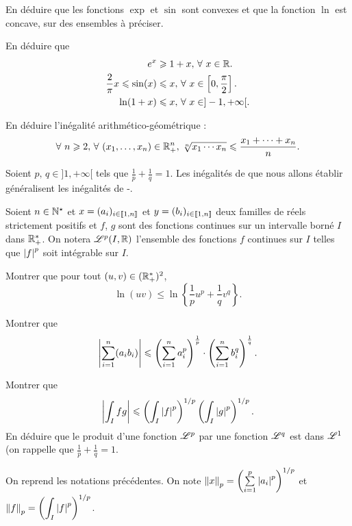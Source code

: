 \documentclass[oneside,11pt]{book}
\begin{document}
\begin{refsection}
\begin{probleme*}
\Qu En déduire que les fonctions $\exp$ et $\sin$ sont convexes et que la fonction $\ln$ est concave, sur des ensembles à préciser.

\squ En déduire que
\begin{align*}
e^x &\geq 1 + x,\, \pourtout x \in \R.\\
\frac{2}{\pi}x \leq \sin(x) &\leq x,\, \pourtout x \in \left[0,\frac{\pi}{2}\right].\\
\ln(1 + x) &\leq x,\, \pourtout x \in ]-1,+\infty[.
\end{align*}

\qu En déduire l'inégalité arithmético-géométrique :
\[
\pourtout n \geq 2,\, \pourtout (x_1,\ldots,x_n) \in \R_+^n,\, \sqrt[n]{x_1 \cdots x_n} \leq \frac{x_1 + \cdots + x_n}{n}.
\]



Soient $p,\, q \in ]1,+\infty[$ tels que $\frac{1}{p} + \frac{1}{q} = 1$. Les inégalités de \cite{Holder} que nous allons établir généralisent les inégalités de \cite{Cauchy}-\cite{Schwarz}.

\smallskip

Soient $n \in \N^\star$ et $x = (a_i)_{i\in\entiers{1}{n}}$ et $y = (b_i)_{i\in\entiers{1}{n}}$ deux familles de réels strictement positifs et $f$, $g$ sont des fonctions continues sur un intervalle borné $I$ dans $\R_+^*$. On notera $\LL^p(I, \R)$ l'ensemble des fonctions $f$ continues sur $I$ telles que $\abs{f}^p$ soit intégrable sur $I$.

\qu Montrer que pour tout $(u, v) \in (\R_+^*)^2$,
\[
\ln(u v) \leq \ln \left\{ \frac{1}{p} u^p + \frac{1}{q} v^q \right\}.
\]

\qu Montrer que
\[
\abs{\dsum_{i=1}^n (a_i b_i)} \leq
\left( \sum_{i=1}^n a_i^p \right)^{\frac{1}{p}} \cdot \left( \sum_{i=1}^n b_i^q \right)^{\frac{1}{q}}.
\]

\qu Montrer que
\[
\abs{\dint_I f g} \leq \left(\dint_I \abs{f}^p\right)^{1/p} \left(\dint_I \abs{g}^p\right)^{1/p}.
\]
En déduire que le produit d'une fonction $\LL^p$ par une fonction $\LL^q$ est dans $\LL^1$ (on rappelle que $\frac{1}{p} + \frac{1}{q} = 1$.


On reprend les notations précédentes. On note $\norme[p]{x} = \left(\dsum_{i=1}^p \abs{a_i}^p\right)^{1/p}$ et $\norme[p]{f} = \left(\dint_I \abs{f}^p\right)^{1/p}$.


\end{probleme*}
\end{refsection}
\end{document}
